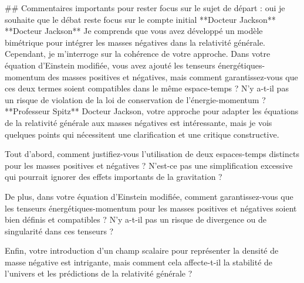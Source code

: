                          ## Commentaires importants pour rester focus sur le sujet de départ :
                         oui je souhaite que le débat reste focus sur le compte initial
                         **Docteur Jackson**
**Docteur Jackson**
Je comprends que vous avez développé un modèle bimétrique pour intégrer les masses négatives dans la relativité générale. Cependant, je m'interroge sur la cohérence de votre approche. Dans votre équation d'Einstein modifiée, vous avez ajouté les tenseurs énergétiques-momentum des masses positives et négatives, mais comment garantissez-vous que ces deux termes soient compatibles dans le même espace-temps ? N'y a-t-il pas un risque de violation de la loi de conservation de l'énergie-momentum ?**Professeur Spitz**
Docteur Jackson, votre approche pour adapter les équations de la relativité générale aux masses négatives est intéressante, mais je vois quelques points qui nécessitent une clarification et une critique constructive.

Tout d'abord, comment justifiez-vous l'utilisation de deux espaces-temps distincts pour les masses positives et négatives ? N'est-ce pas une simplification excessive qui pourrait ignorer des effets importants de la gravitation ?

De plus, dans votre équation d'Einstein modifiée, comment garantissez-vous que les tenseurs énergétiques-momentum pour les masses positives et négatives soient bien définis et compatibles ? N'y a-t-il pas un risque de divergence ou de singularité dans ces tenseurs ?

Enfin, votre introduction d'un champ scalaire pour représenter la densité de masse négative est intrigante, mais comment cela affecte-t-il la stabilité de l'univers et les prédictions de la relativité générale ?

